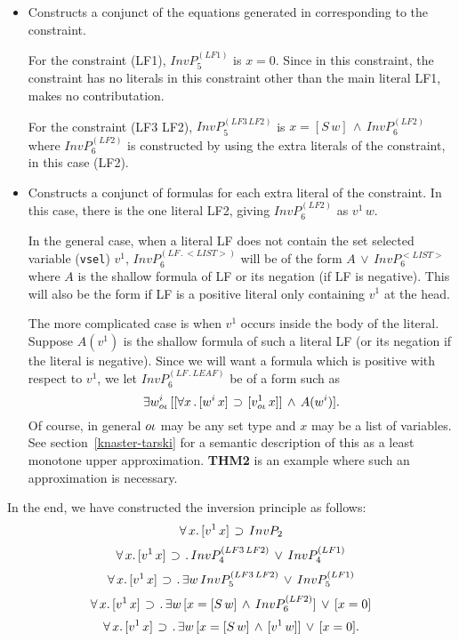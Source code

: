 \begin{enumerate}
\begin{itemize}
\item {\bf {}}  Constructs a conjunct of
the equations generated in  corresponding
to the constraint.  

For the constraint (LF1), $InvP_5^{(LF1)}$ is $x=0$.
Since in this constraint, the constraint has no literals in this
constraint other than the main literal LF1, 
makes no contributation.

For the constraint (LF3 LF2), $InvP_5^{(LF3\, LF2)}$ is
$x=[S\, w]\,\land\, InvP_6^{(LF2)}$
where $InvP_6^{(LF2)}$ is constructed by 
using the extra literals of the constraint, in this case (LF2).

\item {\bf {}}  Constructs a conjunct of
formulas for each extra literal of the constraint.  In this case, there is
the one literal LF2, giving $InvP_6^{(LF2)}$ as $v^1\, w$.

In the general case, when a literal LF does not contain the set selected
variable (\verb+vsel+) $v^1$, $InvP_6^{(LF\, .\, <LIST>)}$ will be of
the form $A\,\lor\, InvP_6^{<LIST>}$ where $A$ is the shallow formula
of LF or its negation (if LF is negative).  This will also be
the form if LF is a positive literal only containing $v^1$ at the head.

The more complicated case is when $v^1$ occurs inside the body of the
literal.  Suppose $A(v^1)$ is the shallow formula of such a literal LF
(or its negation if the literal is negative).
Since we will want a formula which is positive with respect to $v^1$,
we let $InvP_6^{(LF\, . \, LEAF)}$ be of a form such as
$$\exists w^i_{o\iota}\, [[\forall x\, .\, [w^i\, x]\,\mathbin{\supset}\, [v^1_{o\iota}\, x]]\,\land\, A(w^i)].$$
Of course, in general $o\iota$ may be any set type and $x$ may be
a list of variables.
See section~\ref{knaster-tarski} for a semantic description of this
as a least monotone upper approximation.
{\bf THM2} is an example where such an approximation is necessary.
\end{itemize}

In the end, we have constructed the inversion principle as follows:
$$\forall \,x . \, [v^1\, x] \, \mathbin{\supset}\, InvP_2$$
$$\forall \,x . \, [v^1\, x] \, \mathbin{\supset}\, .\,InvP_4^{(LF3\, LF2)} \, \lor\, InvP_4^{(LF1)}$$
$$\forall \,x . \, [v^1\, x] \, \mathbin{\supset}\, .\,\exists w\, InvP_5^{(LF3\, LF2)} \, \lor\, InvP_5^{(LF1)}$$
$$\forall \,x . \, [v^1\, x] \, \mathbin{\supset}\, .\,\exists w\, [x=[S\, w]\,\land\, InvP_6^{(LF2)}] \, \lor\, [x=0]$$
$$\forall \,x . \, [v^1\, x] \, \mathbin{\supset}\, .\,\exists w\, [x=[S\, w]\,\land\, [v^1\, w]] \, \lor\, [x=0].$$


\end{enumerate}
